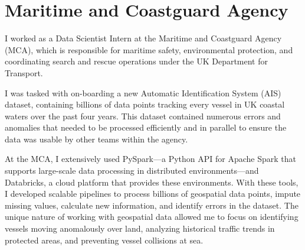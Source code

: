 \section{\label{8:sec:MCA}Maritime and Coastguard Agency}

I worked as a Data Scientist Intern at the Maritime and Coastguard Agency (MCA), which is responsible for maritime safety, environmental protection, and coordinating search and rescue operations under the UK Department for Transport.

I was tasked with on-boarding a new Automatic Identification System (AIS) dataset, containing billions of data points tracking every vessel in UK coastal waters over the past four years. This dataset contained numerous errors and anomalies that needed to be processed efficiently and in parallel to ensure the data was usable by other teams within the agency.

At the MCA, I extensively used PySpark---a Python API for Apache Spark that supports large-scale data processing in distributed environments---and Databricks, a cloud platform that provides these environments. With these tools, I developed scalable pipelines to process billions of geospatial data points, impute missing values, calculate new information, and identify errors in the dataset. The unique nature of working with geospatial data allowed me to focus on identifying vessels moving anomalously over land, analyzing historical traffic trends in protected areas, and preventing vessel collisions at sea.
